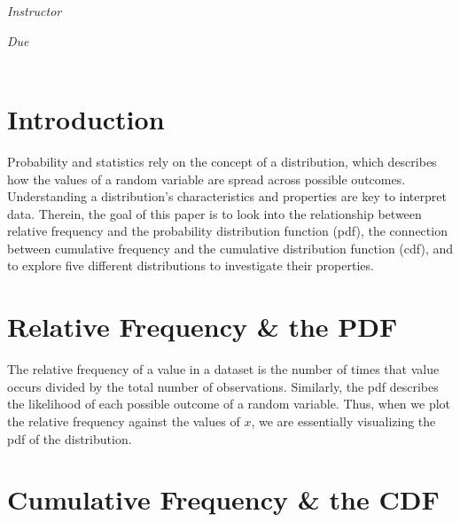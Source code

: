 \documentclass[12pt]{article}
\begin{document}
\begin{titlepage}
\begin{center}
\begin{large}
            \vspace*{1\baselineskip}

            \textit{Instructor} \\[1ex] %
            \professor

            \vspace*{1\baselineskip}

            \textit{Due}\\[1ex]
            {\scshape  \finaldate} \\[0.3\baselineskip] %

            \thispagestyle{empty}

        \end{large}
    \end{center}
\end{titlepage}

\section{Introduction}

Probability and statistics rely on the concept of a distribution, which describes how the values of a random variable are spread across possible outcomes. Understanding a distribution's characteristics and properties are key to interpret data. Therein, the goal of this paper is to look into the relationship between relative frequency and the probability distribution function (pdf), the connection between cumulative frequency and the cumulative distribution function (cdf), and to explore five different distributions to investigate their properties.

\section{Relative Frequency \& the PDF}

The relative frequency of a value in a dataset is the number of times that value occurs divided by the total number of observations. Similarly, the pdf describes the likelihood of each possible outcome of a random variable. Thus, when we plot the relative frequency against the values of \(x\), we are essentially visualizing the pdf of the distribution.

\section{Cumulative Frequency \& the CDF}
\end{document}
